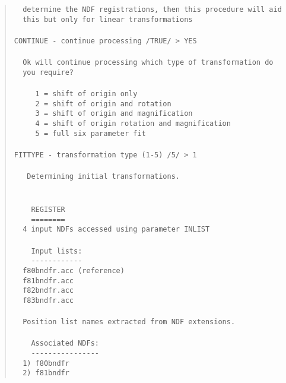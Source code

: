 \begin{quote}
\begin{tabbing}
\verb#  determine the NDF registrations, then this procedure will aid#\\
\verb#  this but only for linear transformations#\\
\verb##\\
\verb#CONTINUE - continue processing /TRUE/ > YES# \\
\verb##\\
\verb#  Ok will continue processing which type of transformation do#\\
\verb#  you require?#\\
\verb##\\
\verb#     1 = shift of origin only#\\
\verb#     2 = shift of origin and rotation#\\
\verb#     3 = shift of origin and magnification#\\
\verb#     4 = shift of origin rotation and magnification#\\
\verb#     5 = full six parameter fit#\\
\verb##\\
\verb#FITTYPE - transformation type (1-5) /5/ > 1# \\
\verb##\\
\verb#   Determining initial transformations.#\\
\verb##\\
\verb##\\
\verb#    REGISTER#\\
\verb#    ========#\\
\verb#  4 input NDFs accessed using parameter INLIST#\\
\verb##\\
\verb#    Input lists:#\\
\verb#    ------------#\\
\verb#  f80bndfr.acc (reference)#\\
\verb#  f81bndfr.acc#\\
\verb#  f82bndfr.acc#\\
\verb#  f83bndfr.acc#\\
\verb##\\
\verb#  Position list names extracted from NDF extensions.#\\
\verb##\\
\verb#    Associated NDFs:#\\
\verb#    ----------------#\\
\verb#  1) f80bndfr#\\
\verb#  2) f81bndfr#\\

\end{tabbing}
\end{quote}

